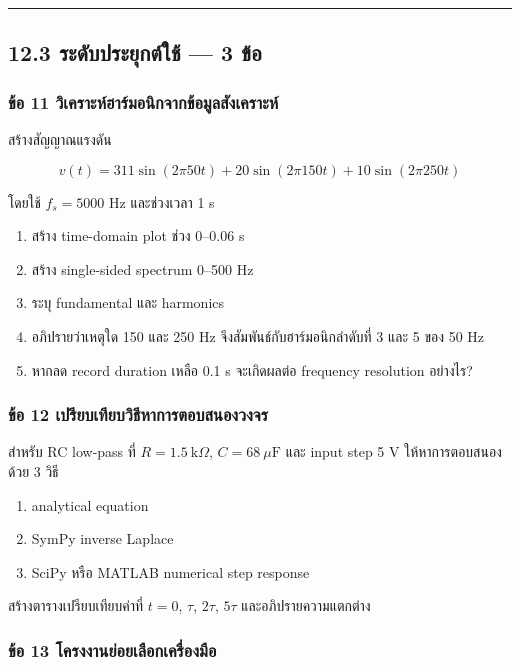 \par\noindent\rule{\textwidth}{0.4pt}\par

\subsection{12.3 ระดับประยุกต์ใช้ — 3 ข้อ}

\subsubsection{ข้อ 11 วิเคราะห์ฮาร์มอนิกจากข้อมูลสังเคราะห์}

สร้างสัญญาณแรงดัน

\[
v(t)=311\sin(2\pi50t)+20\sin(2\pi150t)+10\sin(2\pi250t)
\]

โดยใช้ $f_s=5000$ Hz และช่วงเวลา 1 s

\begin{enumerate}
    \item สร้าง time-domain plot ช่วง 0–0.06 s
    \item สร้าง single-sided spectrum 0–500 Hz
    \item ระบุ fundamental และ harmonics
    \item อภิปรายว่าเหตุใด 150 และ 250 Hz จึงสัมพันธ์กับฮาร์มอนิกลำดับที่ 3 และ 5 ของ 50 Hz
    \item หากลด record duration เหลือ 0.1 s จะเกิดผลต่อ frequency resolution อย่างไร?
\end{enumerate}

\subsubsection{ข้อ 12 เปรียบเทียบวิธีหาการตอบสนองวงจร}

สำหรับ RC low-pass ที่ $R=1.5\ \text{k}\Omega$, $C=68\ \mu\text{F}$ และ input step 5 V ให้หาการตอบสนองด้วย 3 วิธี

\begin{enumerate}
    \item analytical equation
    \item SymPy inverse Laplace
    \item SciPy หรือ MATLAB numerical step response
\end{enumerate}

สร้างตารางเปรียบเทียบค่าที่ $t=0$, $\tau$, $2\tau$, $5\tau$ และอภิปรายความแตกต่าง

\subsubsection{ข้อ 13 โครงงานย่อยเลือกเครื่องมือ}

